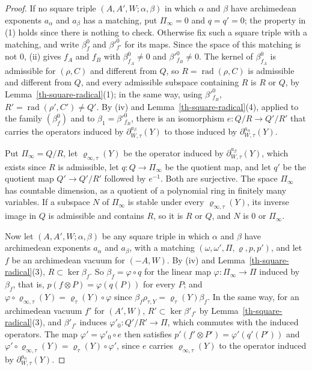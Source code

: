 \begin{proof}
If no square triple $(A,A',W;\alpha,\beta)$ in which $\alpha$ and $\beta$
have archimedean exponents $a_\alpha$ and $a_\beta$ has a matching, put
$\Pi_\infty=0$ and $q=q'=0$; the property in (1) holds since there is nothing
to check. Otherwise fix such a square triple with a matching, and write
$\beta^0_f$ and $\beta'^0_{f'}$ for its maps. Since the space of this matching
is not $0$, (ii) gives $f_A$ and $f_B$ with $\beta^0_{f_A}\neq0$ and
$\beta'^0_{f_B}\neq0$. The kernel of $\beta^0_{f_A}$ is admissible for
$(\rho,C)$ and different from $Q$, so $R=\operatorname{rad}(\rho,C)$ is
admissible and different from $Q$, and every admissible subspace containing $R$
is $R$ or $Q$, by Lemma~\ref{th-square-radical}(1); in the same way, using
$\beta'^0_{f_B}$, $R'=\operatorname{rad}(\rho',C')\neq Q'$. By (iv) and
Lemma~\ref{th-square-radical}(4), applied to the family $(\beta^0_f)$ and to
$\beta_1=\beta'^0_{f_B}$, there is an isomorphism $e\colon Q/R\to Q'/R'$ that
carries the operators induced by $\partial^{a_\beta}_{W,\tau}(Y)$ to those
induced by $\partial^{a_\alpha}_{W,\tau}(Y)$.

Put $\Pi_\infty=Q/R$, let $\varrho_{\infty,\tau}(Y)$ be the operator induced by
$\partial^{a_\beta}_{W,\tau}(Y)$, which exists since $R$ is admissible, let
$q\colon Q\to\Pi_\infty$ be the quotient map, and let $q'$ be the quotient map
$Q'\to Q'/R'$ followed by $e^{-1}$. Both are surjective. The space
$\Pi_\infty$ has countable dimension, as a quotient of a polynomial ring in
finitely many variables. If a subspace $N$ of $\Pi_\infty$ is stable under
every $\varrho_{\infty,\tau}(Y)$, its inverse image in $Q$ is admissible and
contains $R$, so it is $R$ or $Q$, and $N$ is $0$ or $\Pi_\infty$.

Now let $(A,A',W;\alpha,\beta)$ be any square triple in which $\alpha$ and
$\beta$ have archimedean exponents $a_\alpha$ and $a_\beta$, with a matching
$(\omega,\omega',\Pi,\varrho,p,p')$, and let $f$ be an archimedean vacuum for
$(-A,W)$. By (iv) and Lemma~\ref{th-square-radical}(3),
$R\subset\ker\beta_f$. So $\beta_f=\varphi\circ q$ for the linear map
$\varphi\colon\Pi_\infty\to\Pi$ induced by $\beta_f$, that is,
$p(f\otimes P)=\varphi(q(P))$ for every $P$; and
$\varphi\circ\varrho_{\infty,\tau}(Y)=\varrho_\tau(Y)\circ\varphi$ since
$\beta_f\rho_{\tau,Y}=\varrho_\tau(Y)\beta_f$. In the same way, for an
archimedean vacuum $f'$ for $(A',W)$, $R'\subset\ker\beta'_{f'}$ by
Lemma~\ref{th-square-radical}(3), and $\beta'_{f'}$ induces
$\varphi'_0\colon Q'/R'\to\Pi$, which commutes with the induced operators. The
map $\varphi'=\varphi'_0\circ e$ then satisfies
$p'(f'\otimes P')=\varphi'(q'(P'))$ and
$\varphi'\circ\varrho_{\infty,\tau}(Y)=\varrho_\tau(Y)\circ\varphi'$, since $e$
carries $\varrho_{\infty,\tau}(Y)$ to the operator induced by
$\partial^{a_\alpha}_{W,\tau}(Y)$.


\end{proof}
